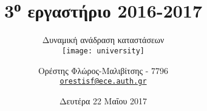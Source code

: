 \newcommand{\mytoptext}{Δυναμική ανάδραση καταστάσεων}


\usepackage{tikz}
\usetikzlibrary{positioning, shapes, arrows}


\subject{Συστήματα Αυτομάτου Ελέγχου II}
\title{3\textsuperscript{ο} εργαστήριο 2016-2017}
\subtitle{\mytoptext\\\centering\texttt{[image: university]}}
\author{%
    Ορέστης Φλώρος-Μαλιβίτσης - 7796\\ \texttt{\href{mailto:orestisf@ece.auth.gr}{orestisf@ece.auth.gr}}%
}
\date{Δευτέρα 22 Μαΐου 2017}


\maketitle
{}
\tableofcontents
\listoffigures
\setcounter{page}{1}




